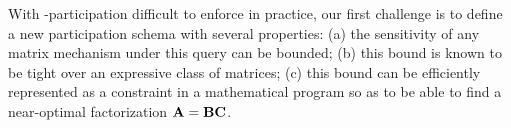 \documentclass{article}
\begin{document}


With \multiepoch-participation difficult to enforce in practice, our first challenge is to define a new participation schema with several properties: (a) the sensitivity of any matrix mechanism under this query can be bounded; (b) this bound is known to be tight over an expressive class of matrices; (c) this bound can be efficiently represented as a constraint in a mathematical program so as to be able to find a near-optimal factorization $\mathbf{A} = \mathbf{B} \mathbf{C}$.
\end{document}
